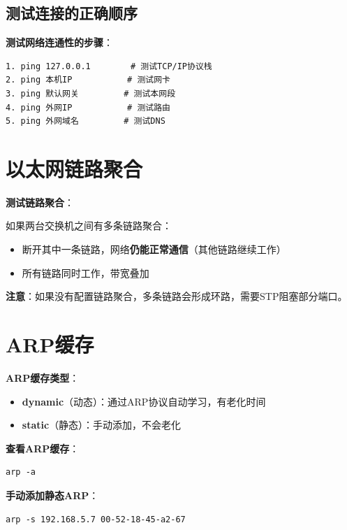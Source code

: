 \documentclass[12pt,a4paper]{ctexart}
\begin{document}
\subsection{测试连接的正确顺序}

\begin{cmdbox}
\textbf{测试网络连通性的步骤}：
\begin{lstlisting}
1. ping 127.0.0.1        # 测试TCP/IP协议栈
2. ping 本机IP           # 测试网卡
3. ping 默认网关         # 测试本网段
4. ping 外网IP           # 测试路由
5. ping 外网域名         # 测试DNS
\end{lstlisting}
\end{cmdbox}

\section{以太网链路聚合}

\begin{keybox}
\textbf{测试链路聚合}：

如果两台交换机之间有多条链路聚合：
\begin{itemize}[itemsep=0pt]
    \item 断开其中一条链路，网络\textbf{仍能正常通信}（其他链路继续工作）
    \item 所有链路同时工作，带宽叠加
\end{itemize}

\textbf{注意}：如果没有配置链路聚合，多条链路会形成环路，需要STP阻塞部分端口。
\end{keybox}

\section{ARP缓存}

\begin{keybox}
\textbf{ARP缓存类型}：

\begin{itemize}[itemsep=0pt]
    \item \textbf{dynamic}（动态）：通过ARP协议自动学习，有老化时间
    \item \textbf{static}（静态）：手动添加，不会老化
\end{itemize}

\textbf{查看ARP缓存}：
\begin{lstlisting}
arp -a
\end{lstlisting}

\textbf{手动添加静态ARP}：
\begin{lstlisting}
arp -s 192.168.5.7 00-52-18-45-a2-67
\end{lstlisting}
\end{keybox}
\end{document}
